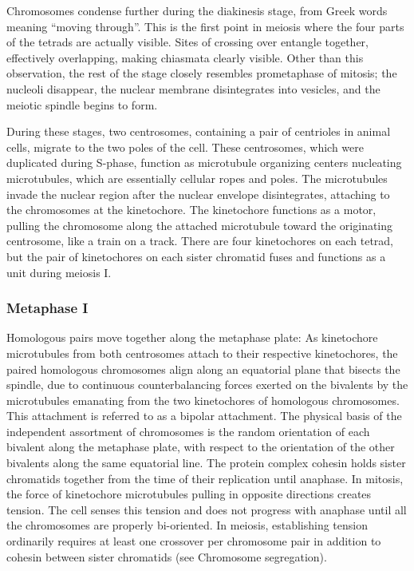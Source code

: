 Chromosomes condense further during the diakinesis stage, from Greek words meaning ``moving through''. This is the first point in meiosis where the four parts of the tetrads are actually visible. Sites of crossing over entangle together, effectively overlapping, making chiasmata clearly visible. Other than this observation, the rest of the stage closely resembles prometaphase of mitosis; the nucleoli disappear, the nuclear membrane disintegrates into vesicles, and the meiotic spindle begins to form.

During these stages, two centrosomes, containing a pair of centrioles in animal cells, migrate to the two poles of the cell. These centrosomes, which were duplicated during S-phase, function as microtubule organizing centers nucleating microtubules, which are essentially cellular ropes and poles. The microtubules invade the nuclear region after the nuclear envelope disintegrates, attaching to the chromosomes at the kinetochore. The kinetochore functions as a motor, pulling the chromosome along the attached microtubule toward the originating centrosome, like a train on a track. There are four kinetochores on each tetrad, but the pair of kinetochores on each sister chromatid fuses and functions as a unit during meiosis I.

\hypertarget{metaphase-i}{%
\subsubsection{Metaphase I}\label{metaphase-i}}

Homologous pairs move together along the metaphase plate: As kinetochore microtubules from both centrosomes attach to their respective kinetochores, the paired homologous chromosomes align along an equatorial plane that bisects the spindle, due to continuous counterbalancing forces exerted on the bivalents by the microtubules emanating from the two kinetochores of homologous chromosomes. This attachment is referred to as a bipolar attachment. The physical basis of the independent assortment of chromosomes is the random orientation of each bivalent along the metaphase plate, with respect to the orientation of the other bivalents along the same equatorial line. The protein complex cohesin holds sister chromatids together from the time of their replication until anaphase. In mitosis, the force of kinetochore microtubules pulling in opposite directions creates tension. The cell senses this tension and does not progress with anaphase until all the chromosomes are properly bi-oriented. In meiosis, establishing tension ordinarily requires at least one crossover per chromosome pair in addition to cohesin between sister chromatids (see Chromosome segregation).

